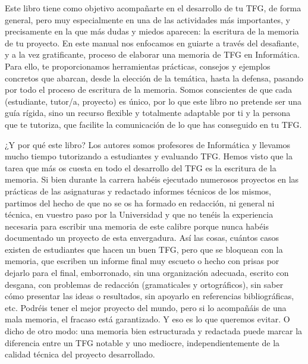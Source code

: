 Este libro tiene como objetivo acompañarte en el desarrollo de tu TFG, de forma general, pero muy especialmente en una de las actividades más importantes, y precisamente en la que más dudas y miedos aparecen: la escritura de la memoria de tu proyecto. En este manual nos enfocamos en guiarte a través del desafiante, y a la vez gratificante, proceso de elaborar una memoria de TFG en Informática. Para ello, te proporcionamos herramientas prácticas, consejos y ejemplos concretos que abarcan, desde la elección de la temática, hasta la defensa, pasando por todo el proceso de escritura de la memoria. Somos conscientes de que cada (estudiante, tutor/a, proyecto) es único, por lo que este libro no pretende ser una guía rígida, sino un recurso flexible y totalmente adaptable por ti y la persona que te tutoriza, que facilite la comunicación de lo que has conseguido en tu TFG.

¿Y por qué este libro? Los autores somos profesores de Informática y llevamos mucho tiempo tutorizando a estudiantes y evaluando TFG. Hemos visto que la tarea que más os cuesta en todo el desarrollo del TFG es la escritura de la memoria. Si bien durante la carrera habéis ejecutado numerosos proyectos en las prácticas de las asignaturas y redactado informes técnicos de los mismos, partimos del hecho de que no se os ha formado en redacción, ni general ni técnica, en vuestro paso por la Universidad y que no tenéis la experiencia necesaria para escribir una memoria de este calibre porque nunca habéis documentado un proyecto de esta envergadura. Así las cosas, cuántos casos existen de estudiantes que hacen un buen TFG, pero que se bloquean con la memoria, que escriben un informe final muy escueto o hecho con prisas por dejarlo para el final, emborronado, sin una organización adecuada, escrito con desgana, con problemas de redacción (gramaticales y ortográficos), sin saber cómo presentar las ideas o resultados, sin apoyarlo en referencias bibliográficas, etc. Podréis tener el mejor proyecto del mundo, pero si lo acompañáis de una mala memoria, el fracaso está garantizado. Y eso es lo que queremos evitar. O dicho de otro modo: una memoria bien estructurada y redactada puede marcar la diferencia entre un TFG notable y uno mediocre, independientemente de la calidad técnica del proyecto desarrollado.

